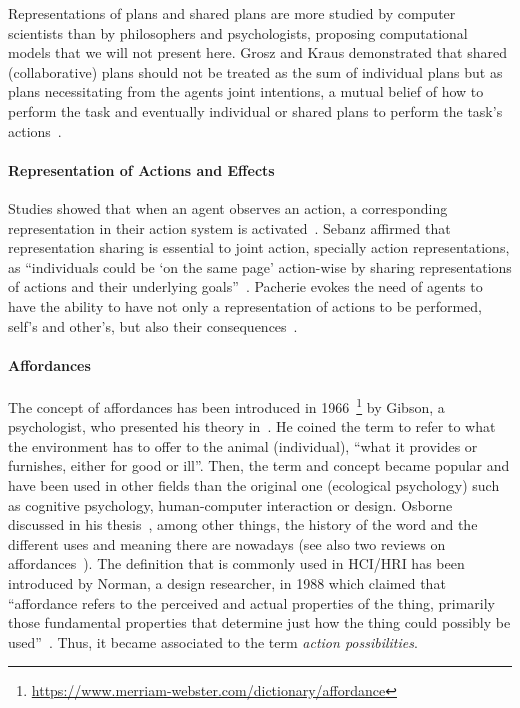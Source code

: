 \documentclass[a4paper,11pt,twoside]{StyleThese}
\begin{document}
Representations of plans and shared plans are more studied by computer scientists than by philosophers and psychologists, proposing computational models that we will not present here. Grosz and Kraus demonstrated that shared (collaborative) plans should not be treated as the sum of individual plans but as plans necessitating from the agents joint intentions, a mutual belief of how to perform the task and eventually individual or shared plans to perform the task's actions~\cite{grosz_1996_collaborative}.

\paragraph{Representation of Actions and Effects}
Studies showed that when an agent observes an action, a corresponding representation in their action system is activated~\cite{rizzolatti_2004_mirror}. Sebanz \etal{} affirmed that representation sharing is essential to joint action, specially action representations, as ``individuals could be ‘on the same page’ action-wise by sharing representations of actions and their underlying goals''~\cite[p.~71]{sebanz_2006_joint}. Pacherie evokes the need of agents to have the ability to have not only a representation of actions to be performed, self's and other's, but also their consequences~\cite{pacherie_2012_agency}. 

\paragraph{Affordances}
The concept of affordances has been introduced in 1966~\footnote{\url{https://www.merriam-webster.com/dictionary/affordance}} by Gibson, a psychologist, who presented his theory in~\cite{gibson_1979_theory}. He coined the term to refer to what the environment has to offer to the animal (individual), ``what it provides or furnishes, either for good or ill''. Then, the term and concept became popular and have been used in other fields than the original one (ecological psychology) such as cognitive psychology, human-computer interaction or design. Osborne discussed in his thesis~\cite{osborne_2014_ecological}, among other things, the history of the word and the different uses and meaning there are nowadays (see also two reviews on affordances~\cite{jamone_2016_affordances, bach_2014_affordance}). The definition that is commonly used in HCI/HRI has been introduced by Norman, a design researcher, in 1988 which claimed that ``affordance refers to the perceived and actual properties of the thing, primarily those fundamental properties that determine just how the thing could possibly be used''~\cite[p.~9]{norman_1988_psychology}. Thus, it became associated to the term \textit{action possibilities}. 
\end{document}
